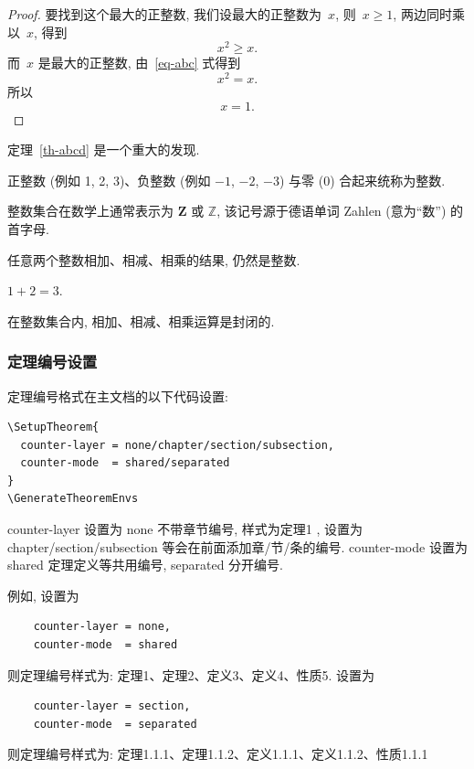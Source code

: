 \begin{proof}
    要找到这个最大的正整数, 我们设最大的正整数为~$x$, 则~$x \geqslant 1$, 两边同时乘以~$x$, 得到
    \begin{equation}\label{eq-abc}
        x^2 \geqslant x.
    \end{equation}
    而~$x$ 是最大的正整数, 由~\ref{eq-abc} 式得到
    \[
        x^2 = x.
    \]
    所以
    \begin{equation*}
        x = 1.
    \end{equation*}
\end{proof}

定理~\ref{th-abcd} 是一个重大的发现.

\begin{definition}[整数]
    正整数 (例如 1, 2, 3)、负整数 (例如 ${-1}$, $-2$, $-3$) 与零 (0) 合起来统称为{\heiti 整数}.
\end{definition}

\begin{remark}
    整数集合在数学上通常表示为 $\mathbf{Z}$ 或 $\mathbb{Z}$, 该记号源于德语单词 Zahlen (意为``数'') 的首字母.
\end{remark}

\begin{property}
    任意两个整数相加、相减、相乘的结果, 仍然是整数.
\end{property}

\begin{example}
    $1+2=3$.
\end{example}

\begin{corollary}
    在整数集合内, 相加、相减、相乘运算是封闭的.
\end{corollary}
\subsubsection{定理编号设置}
定理编号格式在主文档的以下代码设置:
\begin{lstlisting}
\SetupTheorem{
  counter-layer = none/chapter/section/subsection,
  counter-mode  = shared/separated
}
\GenerateTheoremEnvs
\end{lstlisting}
counter-layer 设置为 none 不带章节编号, 样式为定理1 , 设置为chapter/section/subsection 等会在前面添加章/节/条的编号.
counter-mode 设置为 shared 定理定义等共用编号, separated 分开编号.

例如, 设置为
\begin{lstlisting}
    counter-layer = none,
    counter-mode  = shared
\end{lstlisting}
则定理编号样式为: 定理1、定理2、定义3、定义4、性质5.
设置为
\begin{lstlisting}
    counter-layer = section,
    counter-mode  = separated
\end{lstlisting}
则定理编号样式为: 定理1.1.1、定理1.1.2、定义1.1.1、定义1.1.2、性质1.1.1

